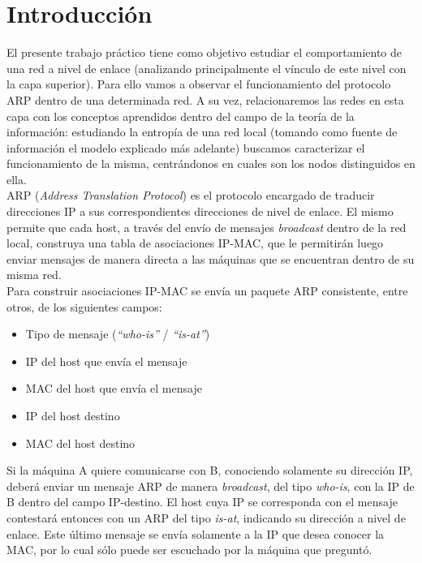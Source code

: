 \section{Introducci\'on}


El presente trabajo pr\'actico tiene como objetivo estudiar el comportamiento de una red a nivel de enlace (analizando principalmente el v\'inculo de este nivel con la capa superior). Para ello vamos a observar el funcionamiento del protocolo ARP dentro de una determinada red. A su vez, relacionaremos las redes en esta capa con los conceptos aprendidos dentro del campo de la teor\'ia de la informaci\'on: estudiando la entrop\'ia de una red local (tomando como fuente de informaci\'on el modelo explicado m\'as adelante) buscamos caracterizar el funcionamiento de la misma, centr\'andonos en cuales son los nodos distinguidos en ella.\\

ARP (\emph{Address Translation Protocol}) es el protocolo encargado de traducir direcciones IP a sus correspondientes direcciones de nivel de enlace. El mismo permite que cada host, a trav\'es del env\'io de mensajes \emph{broadcast} dentro de la red local, construya una tabla de asociaciones IP-MAC, que le permitir\'an luego enviar mensajes de manera directa a las m\'aquinas que se encuentran dentro de su misma red.\\

Para construir asociaciones IP-MAC se env\'ia un paquete ARP consistente, entre otros, de los siguientes campos:

\begin{itemize}
 \item Tipo de mensaje (\emph{``who-is''} / \emph{``is-at''})
 \item IP del host que env\'ia el mensaje
 \item MAC del host que env\'ia el mensaje
 \item IP del host destino
 \item MAC del host destino
\end{itemize}

Si la m\'aquina A quiere comunicarse con B, conociendo solamente su direcci\'on IP, deber\'a enviar un mensaje ARP de manera \emph{broadcast}, del tipo \emph{who-is}, con la IP de B dentro del campo IP-destino. El host cuya IP se corresponda con el mensaje contestar\'a entonces con un ARP del tipo \emph{is-at}, indicando su direcci\'on a nivel de enlace. Este \'ultimo mensaje se env\'ia solamente a la IP que desea conocer la MAC, por lo cual s\'olo puede ser escuchado por la m\'aquina que pregunt\'o.\\

